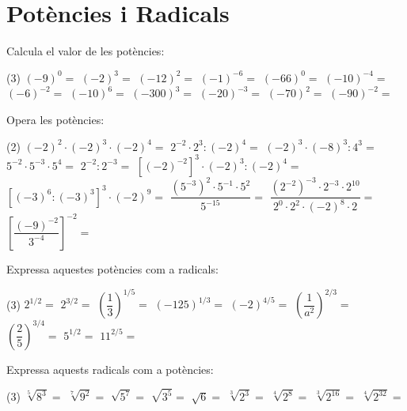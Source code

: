 \documentclass{article}
\let\frac\dfrac
\begin{document}
  \section{Potències i Radicals}
  \begin{mylist}
  	
  	\item Calcula el valor de les potències:
  	\begin{tasks}(3)
  		\task $(-9)^0=$
  		\task $(-2)^3=$
  		\task $(-12)^2=$
  		\task $(-1)^{-6}=$
  		\task $(-66)^0=$
  		\task $(-10)^{-4}=$
  		\task $(-6)^{-2}=$
  		\task $(-10)^6=$
  		\task $(-300)^3=$
  		\task $(-20)^{-3}=$
  		\task $(-70)^2=$
  		\task $(-90)^{-2}=$
  	\end{tasks}
  	
  	\item Opera les potències:
  	\begin{tasks}(2)
  		\task $(-2)^2 \cdot (-2)^3 \cdot (-2)^4=$
  		\task $2^{-2} \cdot 2^3 : (-2)^4=$
  		\task $(-2)^3 \cdot (-8)^3 : 4^3=$
  		\task $5^{-2} \cdot 5^{-3} \cdot 5^4=$
  		\task $2^{-2} : 2^{-3}=$
  		\task $ [ (-2)^{-2} ]^3 \cdot (-2)^3 : (-2)^4=$
  		\task $[ (-3)^6 : (-3)^3 ]^3 \cdot (-2)^9=$		
  		\task $\frac{\left(5^{-3}\right)^2 \cdot 5^{-1} \cdot 5^2}{5^{-15}}=$	
  		\task $\frac{\left(2^{-2}\right)^{-3} \cdot 2^{-3} \cdot 2^{10}}{2^0 \cdot 2^2 \cdot (-2)^{8} \cdot 2}=$	
  		\task $\left[ \frac{(-9)^{-2}}{3^{-4}}\right]^{-2}=$
  	\end{tasks}
  	
  	\item Expressa aquestes potències com a radicals:
  	\begin{tasks}(3)
  		\task $2^{1/2}=$
  			\task $2^{3/2}=$
  				\task $\left(\frac{1}{3}\right)^{1/5}=$
  					\task $(-125)^{1/3}=$
  						\task $(-2)^{4/5}=$
  							\task $\left(\frac{1}{a^2}\right)^{2/3}=$
  								\task $\left(\frac{2}{5}\right)^{3/4}=$
  									\task $5^{1/2}=$
  									\task $11^{2/5}=$
  	\end{tasks}
  	
  	\item Expressa aquests radicals com a potències:
  	\begin{tasks}(3)
  		\task $\sqrt[5]{8^3}=$
  		\task $\sqrt[7]{9^2}=$
  		\task $\sqrt{5^7}=$
  		\task $\sqrt{3^5}=$
  		\task $\sqrt{6}=$
  		\task $\sqrt[3]{2^3}=$
  		\task $\sqrt[4]{2^8}=$
		\task $\sqrt[3]{2^{16}}=$
		\task $\sqrt[4]{2^{32}}=$
  	\end{tasks}
  

\end{mylist}
\end{document}
